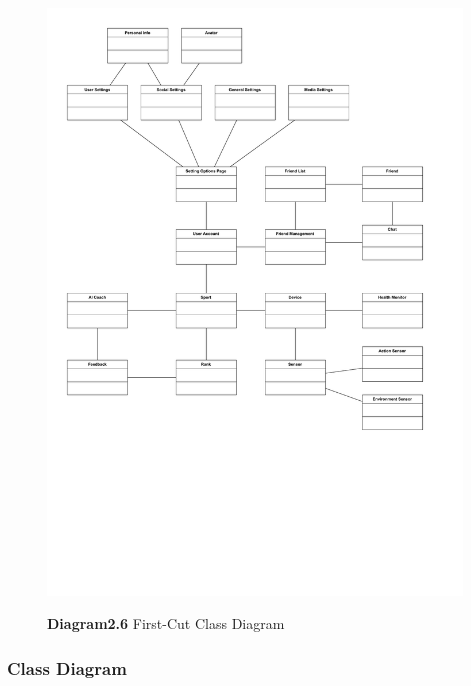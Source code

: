 \documentclass[a4paper]{article}
\begin{document}
	\begin{figure}[H]
		\centering
		\caption*{\textbf{Diagram2.6} First-Cut Class Diagram}
		\includegraphics[width = 0.98\textwidth]{images/ClassDiagram_FirstCut.pdf}
		\label{CD_FC}
	\end{figure}

	\subsubsection{Class Diagram}
\end{document}
